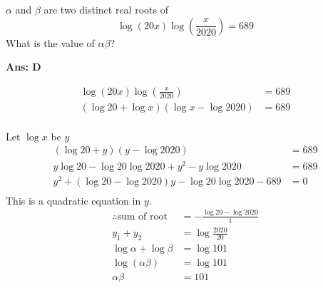 \documentclass[border=3pt,varwidth=80mm]{standalone}
\begin{document}
$\alpha$ and $\beta$ are two distinct real roots of
\begin{equation*}
\log(20x)\log(\frac{x}{2020}) = 689
\end{equation*}
What is the value of $\alpha\beta$? 

\begin{choices}
%
\end{choices}

\begin{answer}
\hrulefill\par
\textbf{Ans: D}

\begin{equation*}
\begin{aligned}
\log(20x)\log(\frac{x}{2020}) &= 689 \\
\left(\log 20 + \log x\right)\left(\log x-\log 2020\right) &= 689 \\
\end{aligned}
\end{equation*}

Let $\log x$ be $y$
\begin{equation*}
\begin{aligned}
\left(\log 20 + y\right)\left(y-\log 2020\right) &= 689 \\
y\log20-\log20\log2020+y^2-y\log2020 &= 689 \\
y^2 + \left(\log20-\log2020\right)y -\log20\log2020 - 689 &= 0 \\ 
\end{aligned}
\end{equation*}
This is a quadratic equation in $y$.
\begin{equation*}
\begin{aligned}
\therefore\text{sum of root } &= -\frac{\log20-\log2020}{1} \\
y_1 + y_2			&= \log\frac{2020}{20} \\
\log\alpha + \log\beta &= \log101 \\
\log(\alpha\beta) &= \log101 \\
\alpha\beta &= 101 \\
\end{aligned}
\end{equation*} 
\end{answer}
\end{document}
